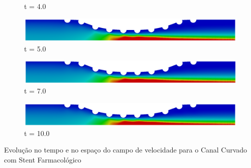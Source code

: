 \begin{frame}
\begin{figure}
\begin{minipage}{.50\linewidth}
      \scriptsize t = 4.0
     \end{minipage}%
     \begin{minipage}{.50\linewidth}
      \centering
      \includegraphics[scale=0.08]{images/vel_CurvedStrut10000.png}\\
      \scriptsize t = 5.0
 \end{minipage}
     \begin{minipage}{.50\linewidth}
     \medskip
      \centering
      \includegraphics[scale=0.08]{images/vel_CurvedStrut14000.png}\\
      \scriptsize t = 7.0
     \end{minipage}%
     \begin{minipage}{.50\linewidth}
     \medskip
      \centering
      \includegraphics[scale=0.08]{images/vel_CurvedStrut20000.png}\\
      \scriptsize t = 10.0
     \end{minipage}
\end{figure}
\vspace{0cm}
\centering \scriptsize Evolução no tempo e no espaço do campo de velocidade para o Canal Curvado com Stent Farmacológico
\end{frame}



